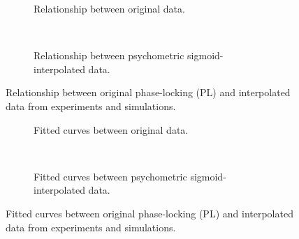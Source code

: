 \newpage

\begin{multicols}{2}

\begin{figure}[H]
     \centering
    \begin{subfigure}[t]{0.41\textwidth}
        \centering
        
        \caption{Relationship between original data.}
        \label{fig:relationship-original}
    \end{subfigure}
    \\ \vspace{\baselineskip}
    \begin{subfigure}[t]{0.41\textwidth}
        \centering
        
        \caption{Relationship between psychometric sigmoid-interpolated data.}
        \label{fig:relationship-sigmoid}
    \end{subfigure}
    \caption[Simulations-experiments relationships]{Relationship between original phase-locking (PL) and interpolated data from experiments and simulations.}
    \label{fig:all-relationships}
\end{figure}

\columnbreak

\begin{figure}[H]
     \centering
    \begin{subfigure}[t]{0.41\textwidth}
        \centering
        
        \caption{Fitted curves between original data.}
        \label{fig:relationship-fit-original}
    \end{subfigure}
    \\ \vspace{\baselineskip}
    \begin{subfigure}[t]{0.41\textwidth}
        \centering
        
        \caption{Fitted curves between psychometric sigmoid-interpolated data.}
        \label{fig:relationship-fit-sigmoid}
    \end{subfigure}
    \caption[Simulations-experiments relationships with fitted curves]{Fitted curves between original phase-locking (PL) and interpolated data from experiments and simulations.}
    \label{fig:all-fit-relationships}
\end{figure}

\end{multicols}